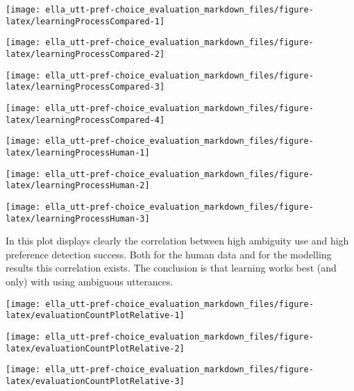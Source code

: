 \documentclass[]{article}
\begin{document}
\begin{center}\texttt{[image: ella\_utt-pref-choice\_evaluation\_markdown\_files/figure-latex/learningProcessCompared-1]} \end{center}

\begin{center}\texttt{[image: ella\_utt-pref-choice\_evaluation\_markdown\_files/figure-latex/learningProcessCompared-2]} \end{center}

\begin{center}\texttt{[image: ella\_utt-pref-choice\_evaluation\_markdown\_files/figure-latex/learningProcessCompared-3]} \end{center}

\begin{center}\texttt{[image: ella\_utt-pref-choice\_evaluation\_markdown\_files/figure-latex/learningProcessCompared-4]} \end{center}

\begin{center}\texttt{[image: ella\_utt-pref-choice\_evaluation\_markdown\_files/figure-latex/learningProcessHuman-1]} \end{center}

\begin{center}\texttt{[image: ella\_utt-pref-choice\_evaluation\_markdown\_files/figure-latex/learningProcessHuman-2]} \end{center}

\begin{center}\texttt{[image: ella\_utt-pref-choice\_evaluation\_markdown\_files/figure-latex/learningProcessHuman-3]} \end{center}

In this plot displays clearly the correlation between high ambiguity use
and high preference detection success. Both for the human data and for
the modelling results this correlation exists. The conclusion is that
learning works best (and only) with using ambiguous utterances.

\begin{center}\texttt{[image: ella\_utt-pref-choice\_evaluation\_markdown\_files/figure-latex/evaluationCountPlotRelative-1]} \end{center}

\begin{center}\texttt{[image: ella\_utt-pref-choice\_evaluation\_markdown\_files/figure-latex/evaluationCountPlotRelative-2]} \end{center}

\begin{center}\texttt{[image: ella\_utt-pref-choice\_evaluation\_markdown\_files/figure-latex/evaluationCountPlotRelative-3]} \end{center}
\end{document}
